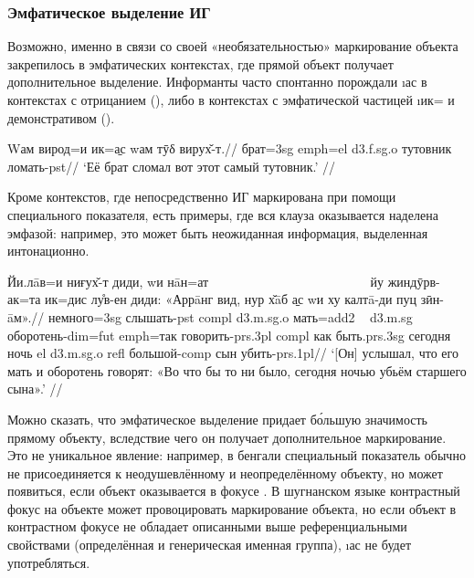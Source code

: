 \subsubsection{Эмфатическое выделение ИГ} \label{dom-emphatic}

Возможно, именно в связи со своей «необязательностью» маркирование объекта закрепилось в эмфатических контекстах, где прямой объект получает дополнительное выделение. Информанты часто спонтанно порождали \i{ас} в контекстах с отрицанием (), либо в контекстах с эмфатической частицей \i{ик}= и демонстративом ().

\begingl
\gla Wам вирод=и ик=\b{ас} wам тӯδ вирух̌-т.//
 брат={\sc 3sg} {\sc emph=el} {\sc d3.f.sg.o} тутовник ломать-{\sc pst}//
\glft ‘Её брат сломал вот этот самый тутовник.’ \trailingcitation{[элицитация, 2022]}//
\endgl \xe

Кроме контекстов, где непосредственно ИГ маркирована при помощи специального показателя, есть примеры, где вся клауза оказывается наделена эмфазой: например, это может быть неожиданная информация, выделенная интонационно.

\begingl
\gla Йи.лāв=и ниғух̌-т диди, wи нāн=ат ~~~~~~~~~~~~~~~~~~~~~~~~ йу жиндӯрв-ак=та ик=дис лу̊в-ен диди: «Аррāнг вид, нур х̌āб \b{ас} wи ху калтā-ди пуц зӣн-āм».//
\glc немного={\sc 3sg} слышать-{\sc pst} {\sc compl} {\sc d3.m.sg.o} мать={\sc add2} ~ {\sc d3.m.sg} оборотень-{\sc dim=fut} {\sc emph}=так говорить-{\sc prs.3pl} {\sc compl} как быть.{\sc prs.3sg} сегодня ночь {\sc el} {\sc d3.m.sg.o} {\sc refl} большой-{\sc comp} сын убить-{\sc prs.1pl}//
\glft ‘[Он] услышал, что его мать и оборотень говорят: «Во что бы то ни было, сегодня ночью убьём старшего сына».’ //
\endgl \xe

Можно сказать, что эмфатическое выделение придает бо́льшую значимость прямому объекту, вследствие чего он получает дополнительное маркирование. Это не уникальное явление: например, в бенгали специальный показатель обычно не присоединяется к неодушевлённому и неопределённому объекту, но может появиться, если объект оказывается в фокусе \parencite[461]{subbarao2016}. В шугнанском языке контрастный фокус на объекте может провоцировать маркирование объекта, но если объект в контрастном фокусе не обладает описанными выше референциальными свойствами (определённая и генерическая именная группа), \i{ас} не будет употребляться.

